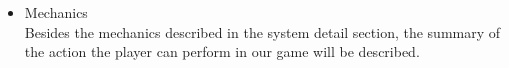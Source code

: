 \documentclass[12pt,oneside,openright,a4paper]{cpe-english-project}
\begin{document}
\begin{itemize}
%
%
	
	


\item Mechanics \\
Besides the mechanics described in the system detail section, the summary of the action the player can perform in our game will be described.


\end{itemize}
\end{document}
